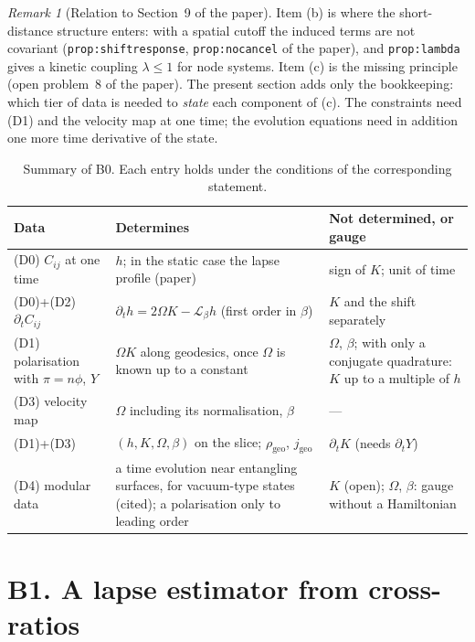 \documentclass[a4paper,11pt]{article}
\theoremstyle{definition}
\theoremstyle{remark}
\newtheorem{remark}[theorem]{Remark}
\newcommand{\Lie}{\mathcal{L}}
\begin{document}
\begin{remark}[Relation to Section~9 of the paper]
Item (b) is where the short-distance structure enters: with a spatial cutoff the induced terms are not covariant (\texttt{prop:shiftresponse}, \texttt{prop:nocancel} of the paper), and \texttt{prop:lambda} gives a kinetic coupling $\lambda\le1$ for node systems. Item (c) is the missing principle (open problem~8 of the paper). The present section adds only the bookkeeping: which tier of data is needed to \emph{state} each component of (c). The constraints need \textup{(D1)} and the velocity map at one time; the evolution equations need in addition one more time derivative of the state.
\end{remark}

\begin{table}[ht]
\centering\small
\begin{tabular}{@{}p{}p{}p{}@{}}
\toprule
Data & Determines & Not determined, or gauge\\
\midrule
(D0) $C_{ij}$ at one time & $h$; in the static case the lapse profile (paper) & sign of $K$; unit of time\\
(D0)+(D2) $\partial_tC_{ij}$ & $\partial_th=2\Omega K-\Lie_\beta h$ (first order in $\beta$) & $K$ and the shift separately\\
(D1) polarisation with $\pi=n\phi$, $Y$ & $\Omega K$ along geodesics, once $\Omega$ is known up to a constant & $\Omega$, $\beta$; with only a conjugate quadrature: $K$ up to a multiple of $h$\\
(D3) velocity map & $\Omega$ including its normalisation, $\beta$ & ---\\
(D1)+(D3) & $(h,K,\Omega,\beta)$ on the slice; $\rho_{\mathrm{geo}}$, $j_{\mathrm{geo}}$ & $\partial_tK$ (needs $\partial_tY$)\\
(D4) modular data & a time evolution near entangling surfaces, for vacuum-type states (cited); a polarisation only to leading order & $K$ (open); $\Omega$, $\beta$: gauge without a Hamiltonian\\
\bottomrule
\end{tabular}
\caption{Summary of B0. Each entry holds under the conditions of the corresponding statement.}
\end{table}

\section{B1. A lapse estimator from cross-ratios}
\end{document}
